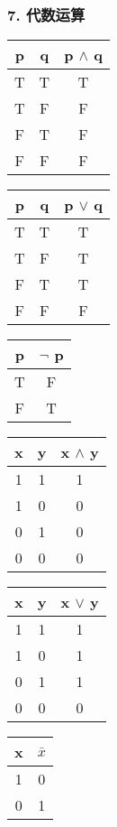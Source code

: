 \documentclass{beamer}
\begin{document}
\begin{CJK*}{UTF8}{gbsn}
\begin{frame}
  \frametitle{7. 代数运算}
  \begin{tabular}{cc|c}
    p& q& p $\land$ q\\
    \hline
    T&T&T\\
    T&F&F\\
    F&T&F\\
    F&F&F\\
  \end{tabular}\hspace{1cm}
  \begin{tabular}{cc|c}
    p& q& p $\lor$ q\\
    \hline
    T&T&T\\
    T&F&T\\
    F&T&T\\
    F&F&F\\
  \end{tabular}\hspace{1cm}
  \begin{tabular}{c|c}
    p& $\lnot$ p\\
    \hline
    T&F\\
    F&T\\
  \end{tabular}

  \vspace{1cm}\pause
    \begin{tabular}{cc|c}
    x& y& x $\land$ y\\
    \hline
    1&1&1\\
    1&0&0\\
    0&1&0\\
    0&0&0\\
  \end{tabular}\hspace{1cm}
  \begin{tabular}{cc|c}
    x& y& x $\lor$ y\\
    \hline
    1&1&1\\
    1&0&1\\
    0&1&1\\
    0&0&0\\
  \end{tabular}\hspace{1cm}
  \begin{tabular}{c|c}
    x& $\bar{x}$\\
    \hline
    1&0\\
    0&1\\
  \end{tabular}
  

\end{frame}
\end{CJK*}
\end{document}

